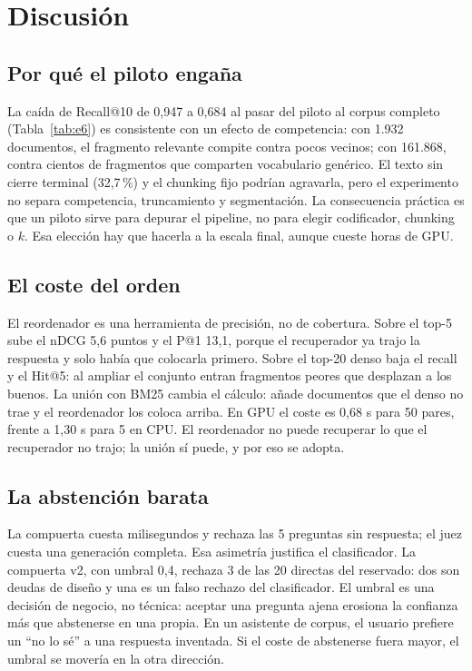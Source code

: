 \section{Discusi\'on}
\label{sec:discusion}

\subsection{Por qu\'e el piloto enga\~na}

La ca\'ida de Recall@10 de 0,947 a 0,684 al pasar del piloto al corpus completo (Tabla~\ref{tab:e6}) es consistente con un efecto de competencia: con 1.932 documentos, el fragmento relevante compite contra pocos vecinos; con 161.868, contra cientos de fragmentos que comparten vocabulario gen\'erico. El texto sin cierre terminal (32,7\,\%) y el chunking fijo podr\'ian agravarla, pero el experimento no separa competencia, truncamiento y segmentaci\'on. La consecuencia pr\'actica es que un piloto sirve para depurar el pipeline, no para elegir codificador, chunking o $k$. Esa elecci\'on hay que hacerla a la escala final, aunque cueste horas de GPU.

\subsection{El coste del orden}

El reordenador es una herramienta de precisi\'on, no de cobertura. Sobre el top-5 sube el nDCG 5,6 puntos y el P@1 13,1, porque el recuperador ya trajo la respuesta y solo hab\'ia que colocarla primero. Sobre el top-20 denso baja el recall y el Hit@5: al ampliar el conjunto entran fragmentos peores que desplazan a los buenos. La uni\'on con BM25 cambia el c\'alculo: a\~nade documentos que el denso no trae y el reordenador los coloca arriba. En GPU el coste es 0,68 s para 50 pares, frente a 1,30 s para 5 en CPU. El reordenador no puede recuperar lo que el recuperador no trajo; la uni\'on s\'i puede, y por eso se adopta.

\subsection{La abstenci\'on barata}

La compuerta cuesta milisegundos y rechaza las 5 preguntas sin respuesta; el juez cuesta una generaci\'on completa. Esa asimetr\'ia justifica el clasificador. La compuerta v2, con umbral 0,4, rechaza 3 de las 20 directas del reservado: dos son deudas de dise\~no y una es un falso rechazo del clasificador. El umbral es una decisi\'on de negocio, no t\'ecnica: aceptar una pregunta ajena erosiona la confianza m\'as que abstenerse en una propia. En un asistente de corpus, el usuario prefiere un ``no lo s\'e'' a una respuesta inventada. Si el coste de abstenerse fuera mayor, el umbral se mover\'ia en la otra direcci\'on.

